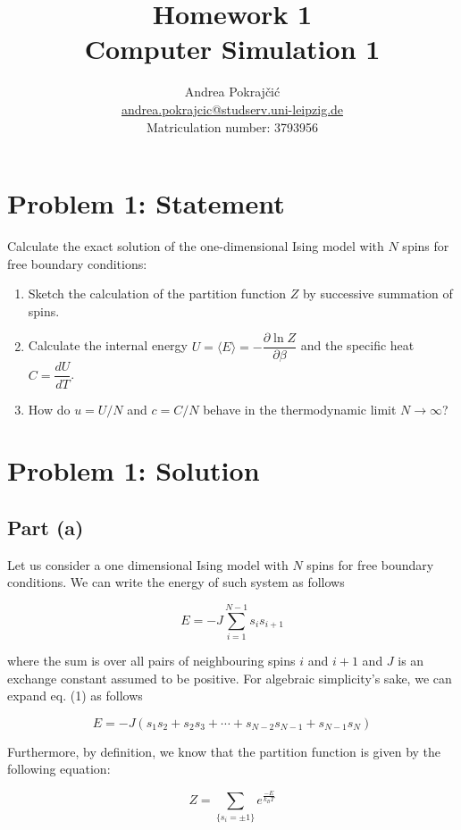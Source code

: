 ﻿\documentclass[11pt]{article}
\title{Homework 1\\[0.5ex]\large Computer Simulation 1}
\author{Andrea Pokraj\v{c}i\'{c}\\
    \normalsize\href{mailto:andrea.pokrajcic@studserv.uni-leipzig.de}{andrea.pokrajcic@studserv.uni-leipzig.de}\\
    \normalsize Matriculation number: 3793956}
\date{}
\begin{document}
    
    \maketitle
    
    

    
    \section*{Problem 1: Statement}\label{problem-1-statement}

Calculate the exact solution of the one-dimensional Ising model with
\(N\) spins for free boundary conditions:

\begin{enumerate}
\def\labelenumi{\alph{enumi})}
\item
  Sketch the calculation of the partition function \(Z\) by successive
  summation of spins.
\item
  Calculate the internal energy
  \(U = \langle E\rangle = -\dfrac{\partial \ln Z}{\partial \beta}\) and
  the specific heat \(C = \dfrac{dU}{dT}\).
\item
  How do \(u = U/N\) and \(c = C/N\) behave in the thermodynamic limit
  \(N \to \infty\)?
\end{enumerate}

    \section*{Problem 1: Solution}\label{problem-1-solution}

    \subsection*{Part (a)}

Let us consider a one dimensional Ising model with \(N\) spins for free
boundary conditions. We can write the energy of such system as follows

\[
E=-J \sum_{i=1}^{N-1}s_i s_{i+1} \tag{1}
\]

where the sum is over all pairs of neighbouring spins \(i\) and \(i+1\)
and \(J\) is an exchange constant assumed to be positive. For algebraic
simplicity's sake, we can expand eq. (1) as follows

\[
E=-J(s_1s_2+s_2s_3+\cdots+s_{N-2}s_{N-1}+s_{N-1}s_N) \tag{2}
\]

Furthermore, by definition, we know that the partition function is given
by the following equation:

\[
Z=\sum_{\{s_i=\pm1\}} e^{\frac{-E}{k_B T}} \tag{3}
\]
\end{document}
